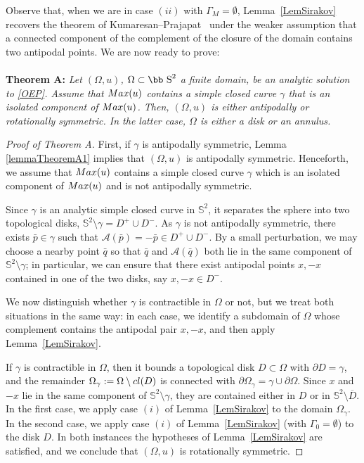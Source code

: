 \documentclass[11pt]{article}
\def\s{\hbox{\bb S}}
\newcommand{\Max}{\textup{Max}}
\numberwithin{equation} {section}
\begin{document}
Observe that, when we are in case $(ii)$ with $\Gamma_M = \emptyset$, Lemma~\ref{LemSirakov} recovers the theorem of Kumaresan--Prajapat~\cite{KP} under the weaker assumption that a connected component of the complement of the closure of the domain contains two antipodal points. We are now ready to prove:
\\
\\
{\bf Theorem A:} {\it Let $(\Omega, u)$, $\Omega \subset \s^2$ a finite domain, be an analytic solution to \eqref{OEP}. Assume that $\Max(u)$ contains a simple closed curve $\gamma$ that is an isolated component of $\Max(u)$. Then, $(\Omega ,u)$ is either antipodally or rotationally symmetric. In the latter case, $\Omega$ is either a disk or an annulus.}

\begin{proof}[Proof of Theorem A]
First, if $\gamma$ is antipodally symmetric, Lemma \ref{lemmaTheoremA1} implies that $(\Omega,u)$ is antipodally symmetric. Henceforth, we assume that $\Max(u)$ contains a simple closed curve $\gamma$ which is an isolated component of $\Max(u)$ and is not antipodally symmetric.

Since $\gamma$ is an analytic simple closed curve in $\mathbb{S}^2$, it separates the sphere into two topological disks, $\mathbb{S}^2 \setminus \gamma = D^+ \cup D^-$. As $\gamma$ is not antipodally symmetric, there exists $\bar p \in \gamma$ such that $\mathcal{A}(\bar p)=-\bar p \in D^+ \cup D^-$. By a small perturbation, we may choose a nearby point $\bar q$ so that $\bar q$ and $\mathcal{A}(\bar q)$ both lie in the same component of $\mathbb{S}^2\setminus \gamma$; in particular, we can ensure that there exist antipodal points $x,-x$ contained in one of the two disks, say $x,-x \in D^-$.

We now distinguish whether $\gamma$ is contractible in $\Omega$ or not, but we treat both situations in the same way: in each case, we identify a subdomain of $\Omega$ whose complement contains the antipodal pair $x,-x$, and then apply Lemma~\ref{LemSirakov}.

If $\gamma$ is contractible in $\Omega$, then it bounds a topological disk $D\subset\Omega$ with $\partial D=\gamma$, and the remainder $\Omega_\gamma:=\Omega\setminus {\rm cl}(D)$ is connected with $\partial \Omega_\gamma=\gamma\cup \partial\Omega$. Since $x$ and $-x$ lie in the same component of $\mathbb{S}^2\setminus\gamma$, they are contained either in $D$ or in $\mathbb{S}^2\setminus \overline{D}$. In the first case, we apply case $(i)$ of Lemma~\ref{LemSirakov} to the domain $\Omega_{\gamma}$. In the second case, we apply case $(i)$ of Lemma~\ref{LemSirakov} (with $\Gamma_0 = \emptyset$) to the disk $D$. In both instances the hypotheses of Lemma~\ref{LemSirakov} are satisfied, and we conclude that $(\Omega,u)$ is rotationally symmetric.


\end{proof}
\end{document}
